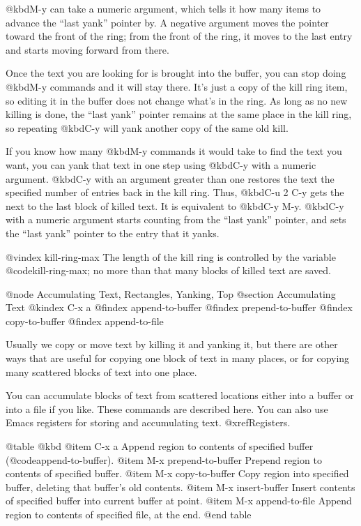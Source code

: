 {{{{{{{  @kbd{M-y} can take a numeric argument, which tells it how many items to
advance the ``last yank'' pointer by.  A negative argument moves the
pointer toward the front of the ring; from the front of the ring, it moves
to the last entry and starts moving forward from there.

  Once the text you are looking for is brought into the buffer, you can
stop doing @kbd{M-y} commands and it will stay there.  It's just a copy of
the kill ring item, so editing it in the buffer does not change what's in
the ring.  As long as no new killing is done, the ``last yank'' pointer
remains at the same place in the kill ring, so repeating @kbd{C-y} will
yank another copy of the same old kill.

  If you know how many @kbd{M-y} commands it would take to find the
text you want, you can yank that text in one step using @kbd{C-y} with
a numeric argument.  @kbd{C-y} with an argument greater than one
restores the text the specified number of entries back in the kill
ring.  Thus, @kbd{C-u 2 C-y} gets the next to the last block of killed
text.  It is equivalent to @kbd{C-y M-y}.  @kbd{C-y} with a numeric
argument starts counting from the ``last yank'' pointer, and sets the
``last yank'' pointer to the entry that it yanks.

@vindex kill-ring-max
  The length of the kill ring is controlled by the variable
@code{kill-ring-max}; no more than that many blocks of killed text are
saved.

@node Accumulating Text, Rectangles, Yanking, Top
@section Accumulating Text
@kindex C-x a
@findex append-to-buffer
@findex prepend-to-buffer
@findex copy-to-buffer
@findex append-to-file

  Usually we copy or move text by killing it and yanking it, but there are
other ways that are useful for copying one block of text in many places, or
for copying many scattered blocks of text into one place.

  You can accumulate blocks of text from scattered locations either into a
buffer or into a file if you like.  These commands are described here.  You
can also use Emacs registers for storing and accumulating text.
@xref{Registers}.

@table @kbd
@item C-x a
Append region to contents of specified buffer (@code{append-to-buffer}).
@item M-x prepend-to-buffer
Prepend region to contents of specified buffer.
@item M-x copy-to-buffer
Copy region into specified buffer, deleting that buffer's old contents.
@item M-x insert-buffer
Insert contents of specified buffer into current buffer at point.
@item M-x append-to-file
Append region to contents of specified file, at the end.
@end table

}}}}}}}
